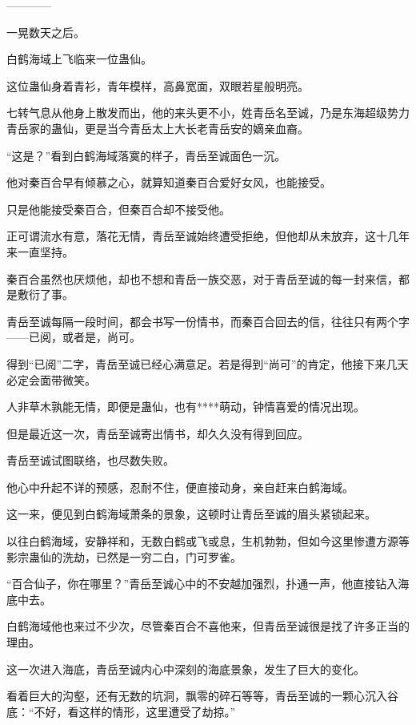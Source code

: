 
\begin{this_body}

------------

一晃数天之后。

白鹤海域上飞临来一位蛊仙。

这位蛊仙身着青衫，青年模样，高鼻宽面，双眼若星般明亮。

七转气息从他身上散发而出，他的来头更不小，姓青岳名至诚，乃是东海超级势力青岳家的蛊仙，更是当今青岳太上大长老青岳安的嫡亲血裔。

“这是？”看到白鹤海域落寞的样子，青岳至诚面色一沉。

他对秦百合早有倾慕之心，就算知道秦百合爱好女风，也能接受。

只是他能接受秦百合，但秦百合却不接受他。

正可谓流水有意，落花无情，青岳至诚始终遭受拒绝，但他却从未放弃，这十几年来一直坚持。

秦百合虽然也厌烦他，却也不想和青岳一族交恶，对于青岳至诚的每一封来信，都是敷衍了事。

青岳至诚每隔一段时间，都会书写一份情书，而秦百合回去的信，往往只有两个字——已阅，或者是，尚可。

得到“已阅”二字，青岳至诚已经心满意足。若是得到“尚可”的肯定，他接下来几天必定会面带微笑。

人非草木孰能无情，即便是蛊仙，也有****萌动，钟情喜爱的情况出现。

但是最近这一次，青岳至诚寄出情书，却久久没有得到回应。

青岳至诚试图联络，也尽数失败。

他心中升起不详的预感，忍耐不住，便直接动身，亲自赶来白鹤海域。

这一来，便见到白鹤海域萧条的景象，这顿时让青岳至诚的眉头紧锁起来。

以往白鹤海域，安静祥和，无数白鹤或飞或息，生机勃勃，但如今这里惨遭方源等影宗蛊仙的洗劫，已然是一穷二白，门可罗雀。

“百合仙子，你在哪里？”青岳至诚心中的不安越加强烈，扑通一声，他直接钻入海底中去。

白鹤海域他也来过不少次，尽管秦百合不喜他来，但青岳至诚很是找了许多正当的理由。

这一次进入海底，青岳至诚内心中深刻的海底景象，发生了巨大的变化。

看着巨大的沟壑，还有无数的坑洞，飘零的碎石等等，青岳至诚的一颗心沉入谷底：“不好，看这样的情形，这里遭受了劫掠。”


\end{this_body}

